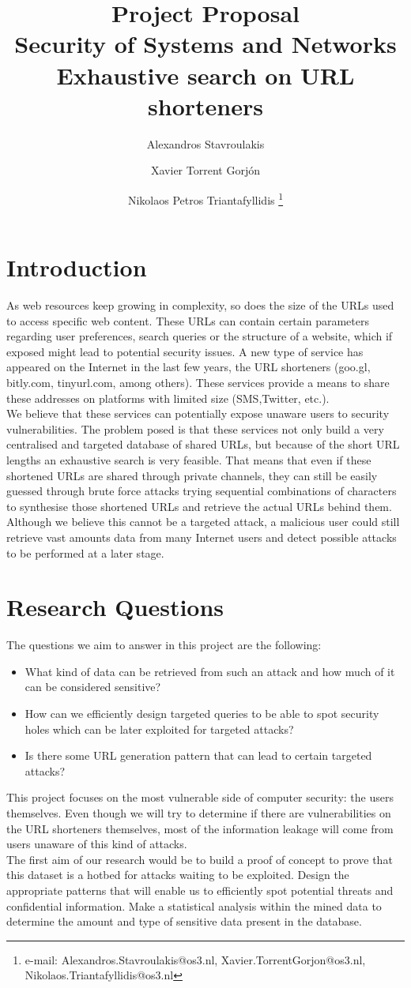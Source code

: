 \documentclass{article}
\author{Alexandros Stavroulakis%
}
\author{Xavier Torrent Gorj\'{o}n%
}
\author{Nikolaos Petros Triantafyllidis%
  \thanks{e-mail: Alexandros.Stavroulakis@os3.nl, Xavier.TorrentGorjon@os3.nl, Nikolaos.Triantafyllidis@os3.nl}}
\affil{University of Amsterdam, System and Network Engineering (MSc)}
\title{ Project Proposal \\ Security of Systems and Networks\\ Exhaustive search on URL shorteners}
\begin{document}
\maketitle


\section{Introduction}
As web resources keep growing in complexity, so does the size of the URLs used to access specific web content. These URLs can contain certain parameters regarding user preferences, search queries or the structure of a website, which if exposed might lead to potential security issues. A new type of service has appeared on the Internet in the last few years, the URL shorteners (goo.gl, bitly.com,  tinyurl.com, among others). These services provide a means to share these addresses on platforms with limited size (SMS,Twitter, etc.). \\
We believe that these services can potentially expose unaware users to security vulnerabilities. The problem posed is that these services not only build a very centralised and targeted database of shared URLs, but because of the short URL lengths an exhaustive search is very feasible. That means that even if these shortened URLs are shared through private channels, they can still be easily guessed through brute force attacks trying sequential combinations of characters to synthesise those shortened URLs and retrieve the actual URLs behind them. Although we believe this cannot be a targeted attack, a malicious user could still retrieve vast amounts data from many Internet users and detect possible attacks to be performed at a later stage. 

\newpage
\section{Research Questions}

The questions we aim to answer in this project are the following:
\begin{itemize}
  \item What kind of data can be retrieved from such an attack and how much of it can be considered sensitive?
  \item How can we efficiently design targeted queries to be able to spot security holes which can be later exploited for targeted attacks?
  \item Is there some URL generation pattern that can lead to certain targeted attacks?
  \end{itemize}
This project focuses on the most vulnerable side of computer security: the users themselves. Even though we will try to determine if there are vulnerabilities on the URL shorteners themselves, most of the information leakage will come from users unaware of this kind of attacks. \\
The first aim of our research would be to build a proof of concept to prove that this dataset is a hotbed for attacks waiting to be exploited. Design the appropriate patterns that will enable us to efficiently spot potential threats and confidential information. Make a statistical analysis within the mined data to determine the amount and type of sensitive data present in the database. 
\end{document}
